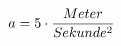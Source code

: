\documentclass[preview]{standalone}
\begin{document}
\begin{align*}
\special{dvisvgm:raw <g id='unique000'>}a = 5 \cdot \frac{Meter}{Sekunde^{2}}\special{dvisvgm:raw </g>}
\end{align*}
\end{document}
